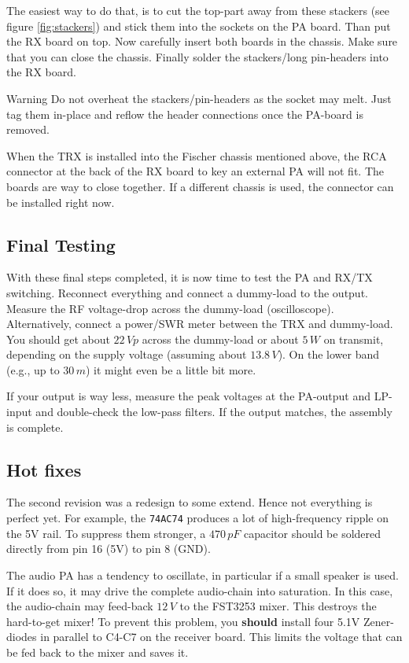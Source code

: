 \documentclass[10pt, a4paper,twoside]{scrartcl}
\newenvironment{warning}{\begin{bclogo}[couleur=red!30,arrondi=.1,logo=\bcattention,ombre=true]{Warning}}{\end{bclogo}}
\begin{document}
The easiest way to do that, is to cut the top-part away from these stackers (see figure \ref{fig:stackers}) and stick them into the sockets on the PA board. Than put the RX board on top. Now carefully insert both boards in the chassis. Make sure that you can close the chassis. Finally solder the stackers/long pin-headers into the RX board. 

\begin{warning}
Do not overheat the stackers/pin-headers as the socket may melt. Just tag them in-place and reflow the header connections once the PA-board is removed.
\end{warning}

When the TRX is installed into the Fischer chassis mentioned above, the RCA connector at the back of the RX board to key an external PA will not fit. The boards are way to close together. If a different chassis is used, the connector can be installed right now.


\subsection{Final Testing}
With these final steps completed, it is now time to test the PA and RX/TX switching. Reconnect everything and connect a dummy-load to the output. Measure the RF voltage-drop across the dummy-load (oscilloscope). Alternatively, connect a power/SWR meter between the TRX and dummy-load. You should get about $22\,Vp$ across the dummy-load or about $5\,W$ on transmit, depending on the supply voltage (assuming about $13.8\,V$). On the lower band (e.g., up to $30\,m$) it might even be a little bit more. 

If your output is way less, measure the peak voltages at the PA-output and LP-input and double-check the low-pass filters. If the output matches, the assembly is complete. 

\subsection{Hot fixes}
The second revision was a redesign to some extend. Hence not everything is perfect yet. For example, the \texttt{74AC74} produces a lot of high-frequency ripple on the 5V rail. To suppress them stronger, a $470\,pF$ capacitor should be soldered directly from pin 16 (5V) to pin 8 (GND).  

The audio PA has a tendency to oscillate, in particular if a small speaker is used. If it does so, it may drive the complete audio-chain into saturation. In this case, the audio-chain may feed-back $12\,V$ to the FST3253 mixer. This destroys the hard-to-get mixer! To prevent this problem, you \textbf{should} install four 5.1V Zener-diodes in parallel to C4-C7 on the receiver board. This limits the voltage that can be fed back to the mixer and saves it. 
\end{document}
